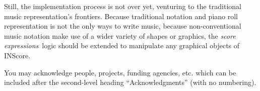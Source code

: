 \documentclass{article}
\newenvironment{ExprCode}		{\vspace{-2mm} \small\verbatim}{\endverbatim\vspace{-2mm}}
\newcommand{\sExpr}{\emph{score expressions}}
\begin{document}
Still, the implementation process is not over yet, venturing to the traditional music representation's frontiers. Because traditional notation and piano roll representation is not the only ways to write music, because non-conventional music notation make use of a wider variety of shapes or graphics, the \sExpr\ logic should be extended to manipulate any graphical objects of INScore.


\begin{acknowledgments}
You may acknowledge people, projects, 
funding agencies, etc. 
which can be included after the second-level heading
``Acknowledgments'' (with no numbering).
\end{acknowledgments} 

\balance


%               
%      
\end{document}
